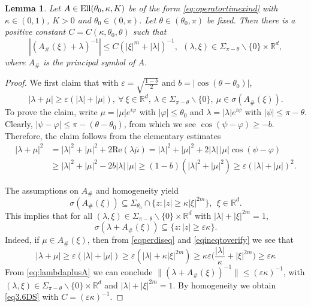\documentclass{amsart}
\theoremstyle{plain}
\theoremstyle{remark}
\theoremstyle{plain}
\newtheorem{lemma}[theorem]{Lemma}
\numberwithin{equation}{section}
\begin{document}
\begin{lemma}\label{Lemmaeq3.6duongsimon}
Let $A\in{\rm Ell}(\theta_0,\kappa,K)$ be of the form \eqref{eq:operatortimexind}
with $\kappa\in(0,1)$, $K>0$ and $\theta_0\in (0,\pi)$. Let $\theta\in (\theta_0,\pi)$ be fixed.
Then there is a positive constant $C=C(\kappa,\theta_0,\theta)$ such that
\begin{equation}\label{eq3.6DS}
|(A_{\#}(\xi) + \lambda)^{-1}|\leq C(|\xi|^{m} + |\lambda|)^{-1},\ \ (\lambda,\xi)\in \Sigma_{\pi-\theta}\backslash\{0\}\times{ \mathbb{R} }^{d},
\end{equation}
where $A_{\#}$ is the principal symbol of $A$.
\end{lemma}
\begin{proof}
We first claim that with $\varepsilon=\sqrt{\tfrac{{1-b}}{{2}}}$ and $b=|\cos(\theta-\theta_0)|$,
\begin{equation}\label{eqineqtoverify}
|\lambda + \mu|\geq \varepsilon (|\lambda|+|\mu|), \ \forall
\ \xi\in { \mathbb{R} }^d, \ \lambda\in \Sigma_{\pi-\theta}\backslash\{0\}, \ \mu\in \sigma(A_{\#}(\xi)).
\end{equation}
To prove the claim, write $\mu=|\mu|e^{i\varphi}$ with $|\varphi|\leq\theta_0$ and
$\lambda=|\lambda|e^{i\psi}$ with $|\psi|\leq\pi-\theta$.
Clearly, $|\psi-\varphi|\leq\pi-(\theta-\theta_0)$, from which we see $\cos(\psi-\varphi)\geq-b$.
Therefore, the claim follows from the elementary estimates
\begin{align*}
| \lambda + \mu|^{2}&= |\lambda|^2 + |\mu|^2 + 2 \text{Re}(\lambda \overline{\mu})
= |\lambda|^{2} + |\mu|^2+2|\lambda|\,|\mu| \cos(\psi-\varphi)
\\ &\geq
|\lambda|^{2}+|\mu|^2 - 2 b|\lambda|\,|\mu| \geq (1-b)(|\lambda|^2+|\mu|^2)\geq \varepsilon (|\lambda|+|\mu|)^2.
\end{align*}

The assumptions on $A_{\#}$ and homogeneity yield
\begin{equation}\label{eqperdiseq}
\sigma(A_{\#}(\xi))\subseteq \Sigma_{\theta_0}\cap\{z:|z|\geq\kappa|\xi|^{2m}\},\ \ \xi\in{ \mathbb{R} }^{d}.
\end{equation}
This implies that for all $(\lambda,\xi)\in \Sigma_{\pi-\theta}\backslash\{0\}\times{ \mathbb{R} }^{d}$ with $|\lambda|+|\xi|^{2m}=1$,
\begin{equation}\label{eq:lambdaplusA}
\sigma(\lambda+A_{\#}(\xi))\subseteq\{z:|z|\geq \varepsilon \kappa\}.
\end{equation}
Indeed, if $\mu\in A_{\#}(\xi)$, then from \eqref{eqperdiseq} and \eqref{eqineqtoverify} we see that
\begin{equation}
|\lambda+\mu|\geq \varepsilon (|\lambda|+|\mu|) \geq \varepsilon (|\lambda|+\kappa|\xi|^{2m})
\geq\kappa \varepsilon \bigg(\frac{|\lambda|}{\kappa}+|\xi|^{2m}\bigg)\geq \varepsilon \kappa
\nonumber
\end{equation}
From  \eqref{eq:lambdaplusA} we can conclude $\|(\lambda+A_{\#}(\xi))^{-1}\|\leq (\varepsilon \kappa)^{-1}$,
with $(\lambda,\xi)\in \Sigma_{\pi-\theta}\backslash\{0\}\times{ \mathbb{R} }^{d}$ and $|\lambda|+|\xi|^{2m}=1$. By homogeneity we obtain \eqref{eq3.6DS} with $C = (\varepsilon \kappa)^{-1}$.
\end{proof}
\end{document}
